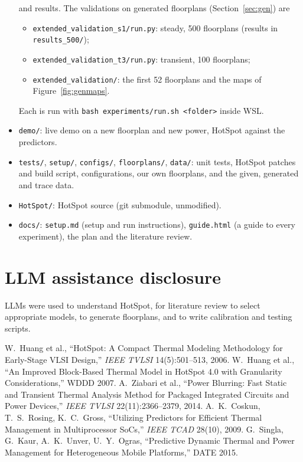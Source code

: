 \documentclass[11pt,a4paper]{article}
\begin{document}
\begin{itemize}
        and results. The validations on generated floorplans (Section~\ref{sec:gen}) are
        \begin{itemize}
          \item \texttt{extended\_validation\_s1/run.py}: steady, 500 floorplans
                (results in \texttt{results\_500/});
          \item \texttt{extended\_validation\_t3/run.py}: transient, 100 floorplans;
          \item \texttt{extended\_validation/}: the first 52 floorplans and the maps of
                Figure~\ref{fig:genmaps}.
        \end{itemize}
        Each is run with \texttt{bash experiments/run.sh <folder>} inside WSL.
  \item \texttt{demo/}: live demo on a new floorplan and new power, HotSpot against the predictors.
  \item \texttt{tests/}, \texttt{setup/}, \texttt{configs/}, \texttt{floorplans/}, \texttt{data/}:
        unit tests, HotSpot patches and build script, configurations, our own floorplans, and the
        given, generated and trace data.
  \item \texttt{HotSpot/}: HotSpot source (git submodule, unmodified).
  \item \texttt{docs/}: \texttt{setup.md} (setup and run instructions), \texttt{guide.html} (a guide
        to every experiment), the plan and the literature review.
\end{itemize}

\section{LLM assistance disclosure}
LLMs were used to understand HotSpot, for literature review to select appropriate models, to
generate floorplans, and to write calibration and testing scripts.

\begin{thebibliography}{9}\small
{} W.~Huang et al., ``HotSpot: A Compact Thermal Modeling Methodology for
  Early-Stage VLSI Design,'' \emph{IEEE TVLSI} 14(5):501--513, 2006.
 W.~Huang et al., ``An Improved Block-Based Thermal Model in HotSpot 4.0 with
  Granularity Considerations,'' WDDD 2007.
 A.~Ziabari et al., ``Power Blurring: Fast Static and Transient Thermal Analysis
  Method for Packaged Integrated Circuits and Power Devices,'' \emph{IEEE TVLSI} 22(11):2366--2379,
  2014.
 A.~K.~Coskun, T.~S.~Rosing, K.~C.~Gross, ``Utilizing Predictors for Efficient
  Thermal Management in Multiprocessor SoCs,'' \emph{IEEE TCAD} 28(10), 2009.
 G.~Singla, G.~Kaur, A.~K.~Unver, U.~Y.~Ogras, ``Predictive Dynamic Thermal and
  Power Management for Heterogeneous Mobile Platforms,'' DATE 2015.
\end{thebibliography}
\end{document}
